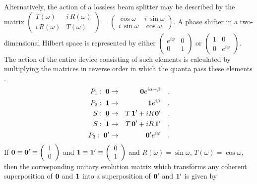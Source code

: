 \documentclass [11pt]{llncs}
\begin{document}
Alternatively, the action of a lossless beam splitter may be
described by the matrix $
\left(
\begin{array}{cc}
T(\omega ) &i \, R( \omega )
\\
i\, R(\omega ) &T( \omega )
 \end{array}
\right)
=
\left(
\begin{array}{cc}
\cos \omega  &i \, \sin \omega
\\
i\, \sin \omega  &\cos \omega
 \end{array}
\right)
$.
A phase shifter in a two-dimensional Hilbert space is represented by
either
$
\left(
\begin{array}{cc}
e^{i\varphi }&0
\\
0&1
 \end{array}
\right)
$
or
$
\left(
\begin{array}{cc}
1&0
\\
0&e^{i\varphi }
 \end{array}
\right)
$.
 The action of the entire device consisting of such elements is
calculated by multiplying the matrices in reverse order in which the
quanta pass these elements \cite{yurke-86,teich:90}.
\begin{eqnarray}
P_1:\; {\bf 0}  &\rightarrow&  {\bf 0} e^{i
\alpha +\beta}
\quad , \\
P_2:\; {\bf 1}  &\rightarrow&  {\bf 1}
e^{i \beta}
\quad , \\
S:\; {\bf 0}
&\rightarrow& T\, {\bf 1}'  +iR\, {\bf 0}'
\quad , \\
S:\; {\bf 1}  &\rightarrow& T\, {\bf 0}'  +iR\,
{\bf 1}'
\quad , \\
P_3:\; {\bf 0}'  &\rightarrow&  {\bf 0}' e^{i
\varphi
}\quad .
\end{eqnarray}
If
$ {\bf 0}  \equiv    {\bf 0}' \equiv
\left(
\begin{array}{c}
1 \\
0
 \end{array}
\right)
$
and
$ {\bf 1} \equiv    {\bf 1}' \equiv
\left(
\begin{array}{c}
0 \\
1
 \end{array}
\right)
$ and $R(\omega )=\sin \omega $, $T(\omega )=\cos \omega$, then
the corresponding unitary evolution matrix
which transforms any coherent superposition of $ {\bf 0} $
and $ {\bf 1} $
into a superposition of
$ {\bf 0}' $
and
$ {\bf 1}' $
 is given by
\end{document}
